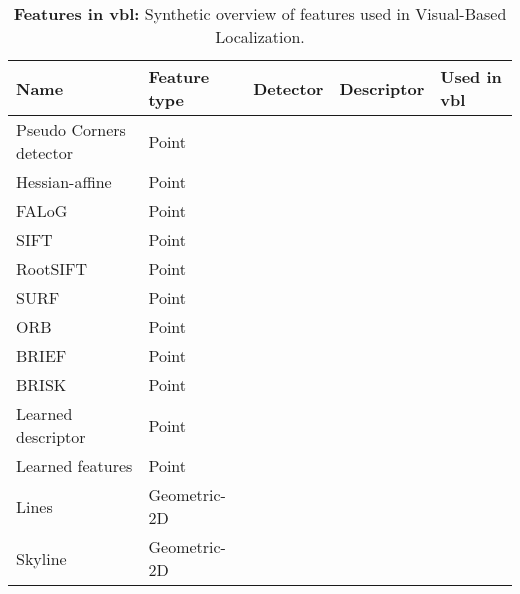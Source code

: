 \begin{landscape}
\begin{table}[t]
	\centering
	\caption[Features in \ac{vbl}]{\label{tab:features_list} \textbf{Features in \ac{vbl}:} Synthetic overview of features used in Visual-Based Localization.}
	\renewcommand{\arraystretch}{1.1}
	\scriptsize{
		\begin{tabular}{l l c c l}
			\hline
			\textbf{Name} 			& \textbf{Feature type} 	& \textbf{Detector} 		& \textbf{Descriptor} 		& \textbf{Used in \ac{vbl}}\\
			\hline
			\hline
			Pseudo Corners detector \citep{Morago2015}		& Point			& \cmark	& \xmark		& \citep{Morago2015,Morago2016} \\
			Hessian-affine \citep{Mikolajczyk2004}			& Point 		& \cmark	& \xmark		& \citep{Jegou2009,Arandjelovic2012,Li2015,Sattler2016,Arandjelovic2014} \\
			FALoG \citep{Wang2013frif}		& Point			& \cmark	& \xmark		& \citep{Feng2016a} \\
			SIFT \citep{Lowe2004} 			& Point 		& \cmark	& \cmark		&  \citep{Song2016,Schindler2007,Liang2013,Zamir2010,Zamir2014,Nister2006,Yan2016} \\
            RootSIFT \citep{Arandjelovic2013}	& Point 		& \xmark	& \cmark		& \citep{Torii2013,Middelberg2014,Arandjelovic2014,Sattler2016,Torii2015}\\
			SURF \citep{Bay2006} 			& Point 		& \cmark	& \cmark		& \citep{Cummins2008,Li2015,Stumm2015a,Qu2016,Song2016,Valgren2010} \\
			ORB \citep{Rublee2011} 			& Point 		& \cmark	& \cmark		& \citep{Griffith2017} \\
			BRIEF \citep{Calonder2010} & Point		& \xmark	& \cmark		& \citep{Krajnik2014,Krajnik2017a} \\
			BRISK \citep{Leutenegger2011brisk} & Point		& \cmark	& \cmark		& \citep{Feng2016a,Middelberg2014,Muhlfellner2015} \\
			Learned descriptor & Point		& \xmark	& \cmark		& \citep{Carlevaris-Bianco2014,Paulin2015,Krajnik2017a,Piasco2019a,Taira2018} \\
			Learned features & Point		& \cmark	& \cmark		& \citep{Sarlin2018a,Dusmanu2019,Noh2017} \\
			\hline
			Lines \citep{VC1962}				& Geometric-2D		& \cmark	& \xmark		& \citep{Hays2008,Arth2015,Morago2016,Ramalingam2011} \\
            Skyline							& Geometric-2D		& \cmark	& \cmark		& \citep{Baatz2012,Tzeng2013,Chen2015} \\

\end{tabular}}
\end{table}
\end{landscape}
